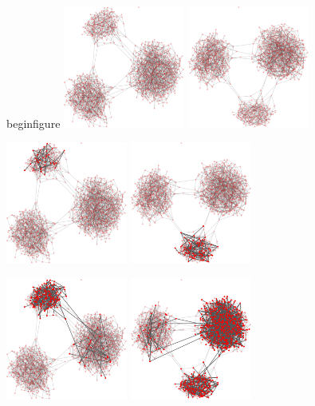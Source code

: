 begin{figure}
\centering
\includegraphics[width=0.3\textwidth]{randomgraphnbrdepth1/network0-crop.pdf}
\hskip2cm
\includegraphics[width=0.3\textwidth]{randomgraphnbrdepth2/network0-crop.pdf}

\includegraphics[width=0.3\textwidth]{randomgraphnbrdepth1/network250-crop.pdf}
\hskip2cm
\includegraphics[width=0.3\textwidth]{randomgraphnbrdepth2/network250-crop.pdf}

\includegraphics[width=0.3\textwidth]{randomgraphnbrdepth1/network500-crop.pdf}
\hskip2cm
\includegraphics[width=0.3\textwidth]{randomgraphnbrdepth2/network500-crop.pdf}

